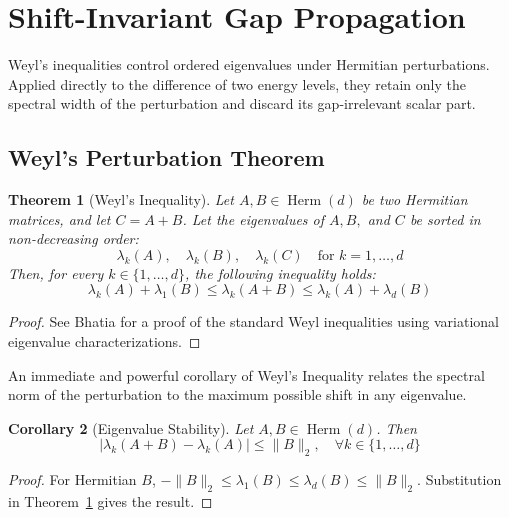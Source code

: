 \documentclass[11pt, a4paper]{article}
\newtheorem{theorem}{Theorem}[section]
\newtheorem{corollary}[theorem]{Corollary}
\newcommand{\norm}[1]{\| #1 \|}
\newcommand{\Herm}{\operatorname{Herm}}
\begin{document}
\section{Shift-Invariant Gap Propagation}

Weyl's inequalities control ordered eigenvalues under Hermitian perturbations. Applied directly to the difference of two energy levels, they retain only the spectral width of the perturbation and discard its gap-irrelevant scalar part.

\subsection{Weyl's Perturbation Theorem}
\begin{theorem}[Weyl's Inequality]
\label{thm:weyl}
Let $A, B \in \Herm(d)$ be two Hermitian matrices, and let $C = A + B$. Let the eigenvalues of $A, B,$ and $C$ be sorted in non-decreasing order:
\begin{equation}
\lambda_k(A), \quad \lambda_k(B), \quad \lambda_k(C) \quad \text{for } k=1,\dots,d
\end{equation}
Then, for every $k \in \{1, \dots, d\}$, the following inequality holds:
\begin{equation}
\lambda_k(A) + \lambda_1(B) \le \lambda_k(A + B) \le \lambda_k(A) + \lambda_d(B)
\end{equation}
\end{theorem}

\begin{proof}
See Bhatia \cite{Bhatia2007} for a proof of the standard Weyl inequalities using variational eigenvalue characterizations.
\end{proof}

An immediate and powerful corollary of Weyl's Inequality relates the spectral norm of the perturbation to the maximum possible shift in any eigenvalue.

\begin{corollary}[Eigenvalue Stability]
\label{cor:eigenvalue-stability}
Let $A, B \in \Herm(d)$. Then
\begin{equation}
|\lambda_k(A + B) - \lambda_k(A)| \le
\norm{B}_2, \quad \forall k \in \{1, \dots, d\}
\end{equation}
\end{corollary}
\begin{proof}
For Hermitian $B$, $-\norm{B}_2\le\lambda_1(B)\le\lambda_d(B)\le\norm{B}_2$. Substitution in Theorem~\ref{thm:weyl} gives the result.
\end{proof}
\end{document}
